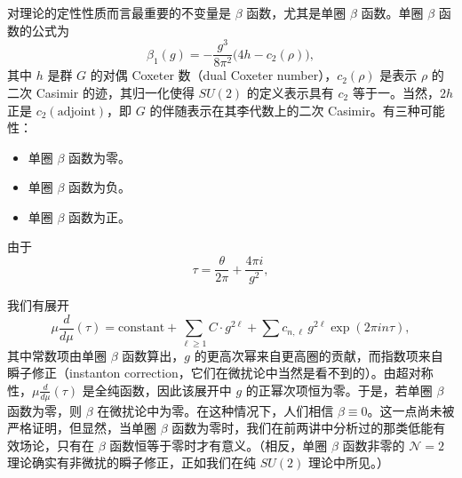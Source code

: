 对理论的定性性质而言最重要的不变量是 $\beta$ 函数，尤其是单圈 $\beta$ 函数。单圈 $\beta$ 函数的公式为
\[
\beta_1(g)=-\frac{g^3}{8\pi^2}\bigl(4h-c_2(\rho)\bigr),
\]
其中 $h$ 是群 $G$ 的对偶 Coxeter 数（dual Coxeter number），$c_2(\rho)$ 是表示 $\rho$ 的二次 Casimir 的迹，其归一化使得 $SU(2)$ 的定义表示具有 $c_2$ 等于一。当然，$2h$ 正是 $c_2(\text{adjoint})$，即 $G$ 的伴随表示在其李代数上的二次 Casimir。有三种可能性：
\begin{itemize}
\item 单圈 $\beta$ 函数为零。
\item 单圈 $\beta$ 函数为负。
\item 单圈 $\beta$ 函数为正。
\end{itemize}


由于
\[
\tau=\frac{\theta}{2\pi}+\frac{4\pi i}{g^2},
\]

我们有展开
\[
\mu\frac{d}{d\mu}(\tau)=\text{constant}+\sum_{\ell\ge1}C\cdot g^{2\ell}+\sum c_{n,\ell}\,g^{2\ell}\exp(2\pi i n\tau),
\]
其中常数项由单圈 $\beta$ 函数算出，$g$ 的更高次幂来自更高圈的贡献，而指数项来自瞬子修正（instanton correction，它们在微扰论中当然是看不到的）。由超对称性，$\mu\frac{d}{d\mu}(\tau)$ 是全纯函数，因此该展开中 $g$ 的正幂次项恒为零。于是，若单圈 $\beta$ 函数为零，则 $\beta$ 在微扰论中为零。在这种情况下，人们相信 $\beta\equiv0$。这一点尚未被严格证明，但显然，当单圈 $\beta$ 函数为零时，我们在前两讲中分析过的那类低能有效场论，只有在 $\beta$ 函数恒等于零时才有意义。（相反，单圈 $\beta$ 函数非零的 $\mathcal{N}=2$ 理论确实有非微扰的瞬子修正，正如我们在纯 $SU(2)$ 理论中所见。）


